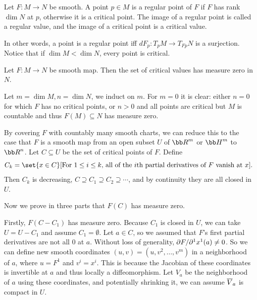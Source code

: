 \eproof

\bdefn

    Let $F\colon M\to N$ be smooth.
    A point $p\in M$ is a {\emphcolor regular point} of $F$ if $F$ has rank $\dim N$ at $p$, otherwise it is a {\emphcolor critical point}.
    The image of a regular point is called a {\emphcolor regular value}, and the image of a critical point is a {\emphcolor critical value}.

\edefn

In other words, a point is a regular point iff $dF_p\colon T_pM\to T_{Fp}N$ is a surjection.
Notice that if $\dim M<\dim N$, every point is critical.

\bthrm[title=Sard's theorem]

    Let $F\colon M\to N$ be smooth map.
    Then the set of critical values has measure zero in $N$.

\ethrm

\bproof

    Let $m=\dim M,n=\dim N$, we induct on $m$.
    For $m=0$ it is clear: either $n=0$ for which $F$ has no critical points, or $n>0$ and all points are critical but $M$ is countable and
    thus $F(M)\subseteq N$ has measure zero.

    By covering $F$ with countably many smooth charts, we can reduce this to the case that $F$ is a smooth map from an open subset $U$ of $\bR^m$
    or $\bH^m$ to $\bR^n$.
    Let $C\subseteq U$ be the set of critical points of $F$.
    Define
    $$ C_k = \set{x\in C}[\hbox{For $1\leq i\leq k$, all of the $i$th partial derivatives of $F$ vanish at $x$}] . $$
    Then $C_k$ is decreasing, $C\supseteq C_1\supseteq C_2\supseteq\cdots$, and by continuity they are all closed in $U$.

    Now we prove in three parts that $F(C)$ has measure zero.
    \benum
        \item Firstly, $F(C-C_1)$ has measure zero.
        Because $C_1$ is closed in $U$, we can take $U=U-C_1$ and assume $C_1=\emptyset$.
        Let $a\in C$, so we assumed that $F$'s first partial derivatives are not all $0$ at $a$.
        Without loss of generality, $\partial F/\partial ^1{x^1}(a)\neq0$.
        So we can define new smooth coordinates $(u,v)=(u,v^2,\dots,v^m)$ in a neighborhood of $a$, where $u=F^1$ and $v^i=x^i$.
        This is because the Jacobian of these coordinates is invertible at $a$ and thus locally a diffeomorphism.
        Let $V_a$ be the neighborhood of $a$ using these coordinates, and potentially shrinking it, we can assume $\overline V_a$ is compact in $U$.

